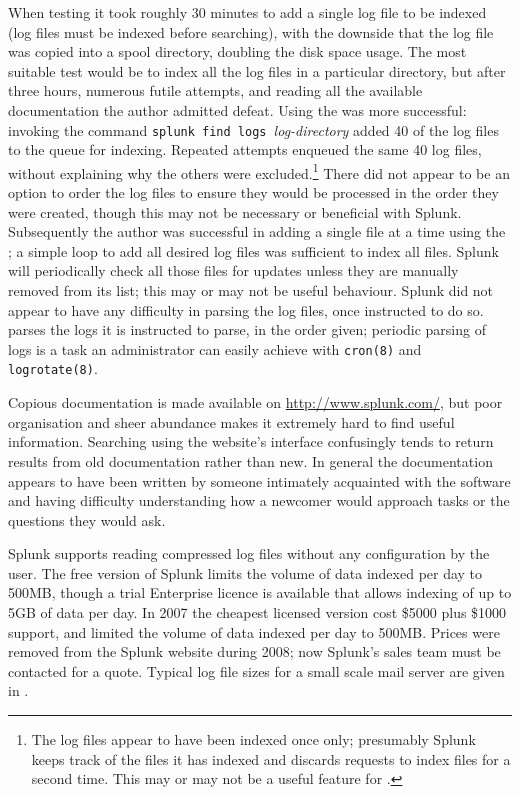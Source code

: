 When testing it took roughly 30 minutes to add a single log file to be
indexed (log files must be indexed before searching), with the downside
that the log file was copied into a spool directory, doubling the disk
space usage.  The most suitable test would be to index all the log files in
a particular directory, but after three hours, numerous futile attempts,
and reading all the available documentation the author admitted defeat.
Using the \CLI{} was more successful: invoking the command \newline{}
\tab{} \texttt{splunk find logs }\textit{log-directory\/}\newline{} added
40 of the \numberOFlogFILES{} log files to the queue for indexing.
Repeated attempts enqueued the same 40 log files, without explaining why
the others were excluded.\footnote{The log files appear to have been
indexed once only; presumably Splunk keeps track of the files it has
indexed and discards requests to index files for a second time.  This may
or may not be a useful feature for \parsername{}.} There did not appear to
be an option to order the log files to ensure they would be processed in
the order they were created, though this may not be necessary or beneficial
with Splunk.  Subsequently the author was successful in adding a single
file at a time using the \CLI{}; a simple loop to add all desired log files
was sufficient to index all files.  Splunk will periodically check all
those files for updates unless they are manually removed from its list;
this may or may not be useful behaviour.  Splunk did not appear to have any
difficulty in parsing the log files, once instructed to do so.
\parsername{} parses the logs it is instructed to parse, in the order
given; periodic parsing of logs is a task an administrator can easily
achieve with \texttt{cron(8)} and \texttt{logrotate(8)}.

Copious documentation is made available on \url{http://www.splunk.com/},
but poor organisation and sheer abundance makes it extremely hard to find
useful information.  Searching using the website's interface confusingly
tends to return results from old documentation rather than new.  In
general the documentation appears to have been written by someone
intimately acquainted with the software and having difficulty understanding
how a newcomer would approach tasks or the questions they would ask.

Splunk supports reading compressed log files without any configuration by
the user.  The free version of Splunk limits the volume of data indexed per
day to 500MB, though a trial Enterprise licence is available that allows
indexing of up to 5GB of data per day.  In 2007 the cheapest licensed
version cost \$5000 plus \$1000 support, and limited the volume of data
indexed per day to 500MB\@.  Prices were removed from the Splunk website
during 2008; now Splunk's sales team must be contacted for a quote.
Typical log file sizes for a small scale mail server are given in
.

